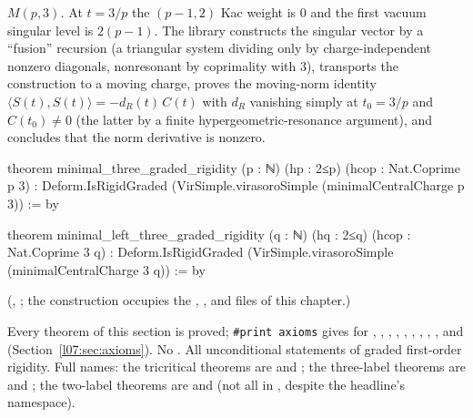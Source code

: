 \emph{$M(p,3)$.} At $t = 3/p$ the $(p-1,2)$ Kac weight is $0$ and the first vacuum singular level is
$2(p-1)$. The library constructs the singular vector by a ``fusion'' recursion (a triangular system dividing
only by charge-independent nonzero diagonals, nonresonant by coprimality with $3$), transports the
construction to a moving charge, proves the moving-norm identity
$\langle S(t),S(t)\rangle = -d_R(t)\,C(t)$ with $d_R$ vanishing simply at $t_0 = 3/p$ and $C(t_0)\ne0$ (the latter by a finite
hypergeometric-resonance argument), and concludes that the norm derivative is nonzero.
\begin{leancode}
theorem minimal_three_graded_rigidity (p : ℕ) (hp : 2≤p) (hcop : Nat.Coprime p 3) :
    Deform.IsRigidGraded (VirSimple.virasoroSimple (minimalCentralCharge p 3)) := by

theorem minimal_left_three_graded_rigidity (q : ℕ) (hq : 2≤q) (hcop : Nat.Coprime 3 q) :
    Deform.IsRigidGraded (VirSimple.virasoroSimple (minimalCentralCharge 3 q)) := by
\end{leancode}
(, ; the
construction occupies the , , 
and  files of this chapter.)

\begin{status}
Every theorem of this section is proved; \texttt{\#print axioms} gives
 for ,
, , ,
, , ,
, ,
 and 
(Section~\ref{l07:sec:axioms}). No . All unconditional statements of graded first-order
rigidity. Full names: the tricritical theorems are 
and ; the three-label theorems are
 and
; the two-label theorems are
 and 
(not all in , despite the headline's namespace).
\end{status}

